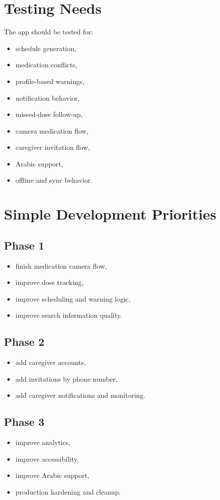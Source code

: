 \documentclass[11pt,a4paper]{article}
\begin{document}
\section{Testing Needs}
The app should be tested for:
\begin{itemize}
    \item schedule generation,
    \item medication conflicts,
    \item profile-based warnings,
    \item notification behavior,
    \item missed-dose follow-up,
    \item camera medication flow,
    \item caregiver invitation flow,
    \item Arabic support,
    \item offline and sync behavior.
\end{itemize}

\section{Simple Development Priorities}

\subsection{Phase 1}
\begin{itemize}
    \item finish medication camera flow,
    \item improve dose tracking,
    \item improve scheduling and warning logic,
    \item improve search information quality.
\end{itemize}

\subsection{Phase 2}
\begin{itemize}
    \item add caregiver accounts,
    \item add invitations by phone number,
    \item add caregiver notifications and monitoring.
\end{itemize}

\subsection{Phase 3}
\begin{itemize}
    \item improve analytics,
    \item improve accessibility,
    \item improve Arabic support,
    \item production hardening and cleanup.
\end{itemize}
\end{document}
